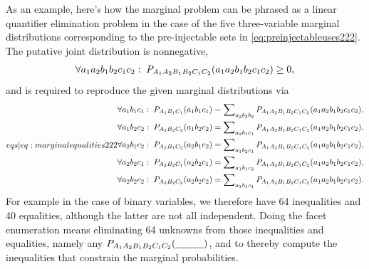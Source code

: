 As an example, here's how the marginal problem can be phrased as a linear quantifier elimination problem in the case of the five three-variable marginal distributions corresponding to the pre-injectable sets in \cref{eq:preinjectableuses222}.
The putative joint distribution is nonnegative,
\begin{align}\label{eq:nonnegativity}
\forall{a_1 a_2 b_1 b_2 c_1 c_2}:\; \pdf[A_1 A_2 B_1 B_2 C_1 C_2]{a_1 a_2 b_1 b_2 c_1 c_2} \geq 0,
\end{align}
and is required to reproduce the given marginal distributions via
\begin{align}\label[eqs]{eq:marginalequalities222}
\begin{split}
&\forall{a_1 b_1 c_1}:\;\pdf[A_1 B_1 C_1]{a_1 b_1 c_1} = \sum\nolimits_{a_2 b_2 b_2}\pdf[A_1 A_2 B_1 B_2 C_1 C_2]{a_1 a_2 b_1 b_2 c_1 c_2},\\
&\forall{a_1 b_2 c_2}:\;\pdf[A_2 B_2 C_2]{a_1 b_2 c_2} = \sum\nolimits_{a_2 b_1 c_1}\pdf[A_1 A_2 B_1 B_2 C_1 C_2]{a_1 a_2 b_1 b_2 c_1 c_2},\\
&\forall{a_2 b_1 c_2}:\;\pdf[A_2 B_1 C_2]{a_2 b_1 c_2} = \sum\nolimits_{a_1 b_2 c_1}\pdf[A_1 A_2 B_1 B_2 C_1 C_2]{a_1 a_2 b_1 b_2 c_1 c_2},\\
&\forall{a_2 b_2 c_1}:\;\pdf[A_2 B_2 C_1]{a_2 b_2 c_1} = \sum\nolimits_{a_1 b_1 c_2}\pdf[A_1 A_2 B_1 B_2 C_1 C_2]{a_1 a_2 b_1 b_2 c_1 c_2},\\
&\forall{a_2 b_2 c_2}:\;\pdf[A_2 B_2 C_2]{a_2 b_2 c_2} = \sum\nolimits_{a_1 b_1 c_1}\pdf[A_1 A_2 B_1 B_2 C_1 C_2]{a_1 a_2 b_1 b_2 c_1 c_2}.
\end{split}
\end{align}
For example in the case of binary variables, we therefore have 64 inequalities and 40 equalities, although the latter are not all independent. Doing the facet enumeration means eliminating 64 unknowns from those inequalities and equalities, namely any $\p[A_1 A_2 B_1 B_2 C_1 C_2]{\underline{\phantom{xxxxx}}}$, and to thereby compute the inequalities that constrain the marginal probabilities.


